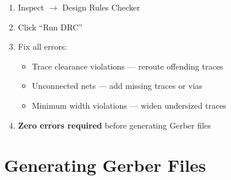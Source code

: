 \documentclass[a4paper,11pt]{article}
\renewcommand*{\,}{ }%
\begin{document}
\begin{enumerate}
    \item Inspect $\rightarrow$ Design Rules Checker
    \item Click ``Run DRC''
    \item Fix all errors:
    \begin{itemize}[noitemsep]
        \item Trace clearance violations --- reroute offending traces
        \item Unconnected nets --- add missing traces or vias
        \item Minimum width violations --- widen undersized traces
    \end{itemize}
    \item \textbf{Zero errors required} before generating Gerber files
\end{enumerate}

\section{Generating Gerber Files}
\label{sec:gerber}
\end{document}
